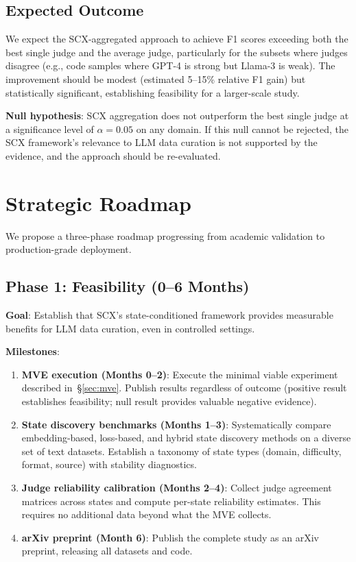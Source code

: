 \documentclass[11pt,twocolumn]{article}
\begin{document}
\subsection{Expected Outcome}

We expect the SCX-aggregated approach to achieve F1 scores exceeding both the best single judge and the average judge, particularly for the subsets where judges disagree (e.g., code samples where GPT-4 is strong but Llama-3 is weak). The improvement should be modest (estimated 5--15\% relative F1 gain) but statistically significant, establishing feasibility for a larger-scale study.

\textbf{Null hypothesis}: SCX aggregation does not outperform the best single judge at a significance level of $\alpha = 0.05$ on any domain. If this null cannot be rejected, the SCX framework's relevance to LLM data curation is not supported by the evidence, and the approach should be re-evaluated.

\section{Strategic Roadmap}

We propose a three-phase roadmap progressing from academic validation to production-grade deployment.

\subsection{Phase 1: Feasibility (0--6 Months)}

\textbf{Goal}: Establish that SCX's state-conditioned framework provides measurable benefits for LLM data curation, even in controlled settings.

\textbf{Milestones}:
\begin{enumerate}
    \item \textbf{MVE execution (Months 0--2)}: Execute the minimal viable experiment described in~\S\ref{sec:mve}. Publish results regardless of outcome (positive result establishes feasibility; null result provides valuable negative evidence).
    \item \textbf{State discovery benchmarks (Months 1--3)}: Systematically compare embedding-based, loss-based, and hybrid state discovery methods on a diverse set of text datasets. Establish a taxonomy of state types (domain, difficulty, format, source) with stability diagnostics.
    \item \textbf{Judge reliability calibration (Months 2--4)}: Collect judge agreement matrices across states and compute per-state reliability estimates. This requires no additional data beyond what the MVE collects.
    \item \textbf{arXiv preprint (Month 6)}: Publish the complete study as an arXiv preprint, releasing all datasets and code.
\end{enumerate}
\end{document}
